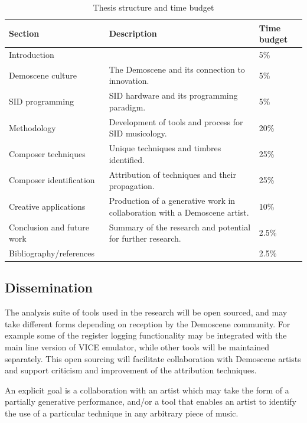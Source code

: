 \documentclass[10pt]{article}
\begin{document}
\begin{multicols*}{2}
\begin{table}[htb]
  \begin{tabular}{|l|l|l|}
        \hline
        Section & Description & Time budget \\
        \hline
        Introduction &  & 5\% \\
        \hline
        Demoscene culture & The Demoscene and its connection to innovation. & 5\% \\
        \hline
        SID programming & SID hardware and its programming paradigm. & 5\% \\
        \hline
        Methodology & Development of tools and process for SID musicology. & 20\% \\
        \hline
        Composer techniques & Unique techniques and timbres identified. & 25\% \\
        \hline
        Composer identification & Attribution of techniques and their propagation. & 25\% \\
        \hline
        Creative applications & Production of a generative work in collaboration with a Demoscene artist.  & 10\% \\
        \hline
        Conclusion and future work & Summary of the research and potential for further research. & 2.5\% \\
        \hline
        Bibliography/references &  & 2.5\% \\
        \hline
  \end{tabular}
  \caption{Thesis structure and time budget}
  \label{table:timebudget}
\end{table}


  \subsection{Dissemination}

  The analysis suite of tools used in the research will be open sourced, and may take different forms depending on reception by the Demoscene community. For example some of the register logging functionality may be integrated with the main line version of VICE emulator, while other tools will be maintained separately. This open sourcing will facilitate collaboration with Demoscene artists and support criticism and improvement of the attribution techniques.

  An explicit goal is a collaboration with an artist which may take the form of a partially generative performance, and/or a tool that enables an artist to identify the use of a particular technique in any arbitrary piece of music.


\end{multicols*}
\end{document}
